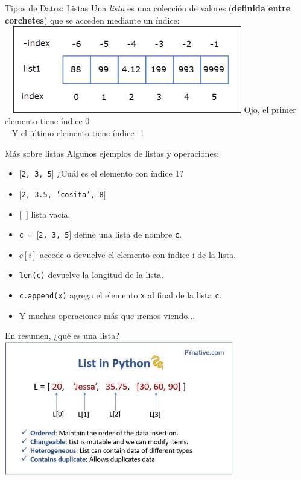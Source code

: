 \documentclass{beamer}
\begin{document}
\begin{frame}{Tipos de Datos:  Listas}
Una \emph{lista} es una colección de valores (\textbf{definida entre corchetes}) que se acceden mediante un índice:  \pause
\\~\
\includegraphics[width=10cm]{recursos/lista.png} \pause
\alert{Ojo, el primer elemento tiene índice 0}\pause
\\~
\alert{Y el último elemento tiene índice -1}
\end{frame}


\begin{frame}{Más sobre listas}
Algunos ejemplos de listas y operaciones:
\begin{itemize}
	\item \texttt{$[$2, 3, 5$]$} \pause 
		¿Cuál es el elemento con índice 1?\pause
	\item \texttt{$[$2, 3.5, 'cosita', 8$]$}\pause
	\item \texttt{$[$ $]$} lista vacía.\pause
	\item \texttt{c = $[$2, 3, 5$]$} define una lista de nombre \texttt{c}.
	\item \texttt{$c[i]$} accede o devuelve el elemento con índice i de la lista.\pause
	\item \texttt{len(c)} devuelve la longitud de la lista.\pause
	\item \texttt{c.append(x)} agrega el elemento \texttt{x} al final de la lista \texttt{c}.
	\item Y muchas operaciones más que iremos viendo...
\end{itemize}
\end{frame}

\begin{frame}{En resumen, ¿qué es una lista?}
\pause
\includegraphics[width=10cm]{recursos/python_list.png} 
\end{frame}
\end{document}
